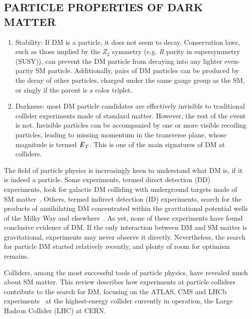 \documentclass{ar-1col}
\newcommand{\MET}{\ensuremath{\slashed{E}_T}\xspace}
\begin{document}
\begin{textbox}
\section{PARTICLE PROPERTIES OF DARK MATTER}

\begin{enumerate} 
\item Stability: If DM is a particle, it does not seem to decay.
Conservation laws, such as those implied by the $Z_2$ symmetry (e.g. \textit{R} parity in supersymmetry (SUSY)), 
can prevent the DM particle from decaying into any
lighter even-parity SM particle. Additionally, pairs of DM
particles can be produced by the decay of other particles, charged
under the same gauge group as the SM, or singly if the
parent is a color triplet.

\item Darkness: most DM particle candidates are effectively invisible to
traditional collider experiments made of standard matter. However,
the rest of the event is not. Invisible particles can be
accompanied by one or more visible recoiling particles, leading to
missing momentum in the transverse plane, whose magnitude is
termed \MET. This is one of the main signatures of DM at
colliders.
\end{enumerate} 

\end{textbox}

The field of particle physics is increasingly keen to understand
what DM is, if it is indeed a particle. Some
experiments, termed \MakeLowercase{Direct Detection} (DD) experiments, look for
galactic DM colliding with underground targets made of SM matter~\cite{0954-3899-43-1-013001}. Others, termed
\MakeLowercase{Indirect Detection} (ID) experiments, search for the products of
annihilating DM concentrated within the gravitational
potential wells of the Milky Way and
elsewhere~\cite{Gaskins:2016cha}. As yet, none of these experiments have
found conclusive evidence of DM. If the only interaction
between DM and SM matter is gravitational, experiments may never
observe it directly. Nevertheless, the search for particle DM started relatively
recently, and plenty of room for optimism remains.

Colliders, among the most successful tools of particle physics,
have revealed much about SM matter. 
This review describes how experiments at particle colliders contribute to the search for DM, focusing on the ATLAS, CMS and LHCb experiments~\cite{ATLAS2008,CMS2008,LHCb2008} at the highest-energy collider currently in operation, the Large Hadron Collider (LHC) at CERN.
\end{document}
